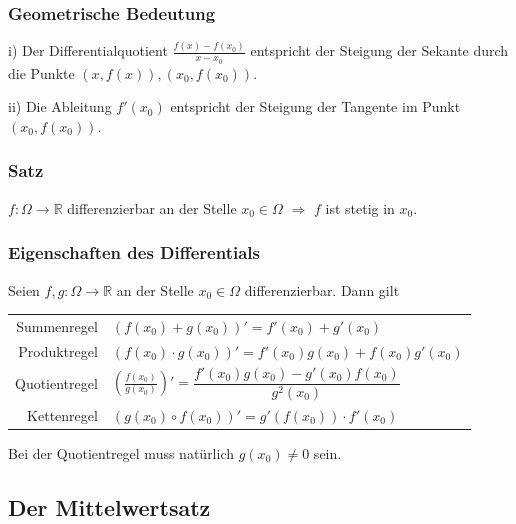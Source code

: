 \documentclass[a4paper, fontsize = 8pt, landscape]{scrartcl}
\newcommand{\R}[0]{\mathbb{R}}
\begin{document}
\begin{multicols*}{3}
    \subsubsection{Geometrische Bedeutung}

    i) Der Differentialquotient $\frac{f(x) - f(x_0)}{x - x_0}$ entspricht der Steigung der Sekante durch die Punkte $(x,f(x)), (x_0, f(x_0))$. \medskip

    ii) Die Ableitung $f'(x_0)$ entspricht der Steigung der Tangente im Punkt $(x_0,f(x_0))$.

    \subsubsection{Satz}

    $f: \Omega \to \R$ differenzierbar an der Stelle $x_0 \in \Omega$ $\Rightarrow$ $f$ ist stetig in $x_0$.

    \subsubsection{Eigenschaften des Differentials}

    Seien $f,g: \Omega \to \R$ an der Stelle $x_0 \in \Omega$ differenzierbar. Dann gilt

    \begin{center}
        \renewcommand{\arraystretch}{1.75}
        \begin{tabular}{r l} \toprule
            Summenregel   & $(f(x_0) + g(x_0))' = f'(x_0) + g'(x_0)$                                                 \\
            Produktregel  & $(f(x_0) \cdot g(x_0))' = f'(x_0) g(x_0) + f(x_0)g'(x_0)$                                \\
            Quotientregel & $\left(\frac{f(x_0)}{g(x_0)}\right)' = \dfrac{f'(x_0) g(x_0) - g'(x_0)f(x_0)}{g^2(x_0)}$ \\
            Kettenregel   & $(g(x_0) \circ f(x_0))' = g'(f(x_0)) \cdot f'(x_0)$                                      \\ \bottomrule
        \end{tabular}
    \end{center}

    Bei der Quotientregel muss natürlich $g(x_0) \neq 0$ sein.


    \subsection{Der Mittelwertsatz}


\end{multicols*}
\end{document}
